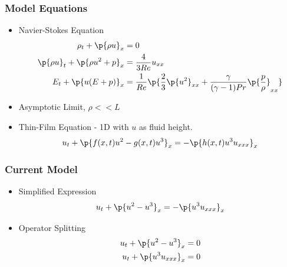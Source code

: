 \documentclass[10pt]{beamer}
\begin{document}
    \begin{frame}
      \frametitle{Model Equations}
      \begin{itemize}
        \item Navier-Stokes Equation
          \begin{align*}
            \rho_t + \p{\rho u}_x &= 0 \\
            \p{\rho u}_t + \p{\rho u^2 + p}_x &=  \frac{4}{3Re} u_{xx} \\
            E_t + \p{u (E + p)}_x &= \frac{1}{Re} \p{\frac{2}{3} \p{u^2}_{xx} + \frac{\gamma}{(\gamma - 1)Pr} \p{\frac{p}{\rho}}_{xx}}
          \end{align*}
        \item Asymptotic Limit, $\rho << L$
        \item Thin-Film Equation - 1D with $u$ as fluid height.
          \[
            u_t + \p{f(x, t) u^2 - g(x, t) u^3}_x = -\p{h(x, t) u^3 u_{xxx}}_x
          \]
      \end{itemize}
    \end{frame}

    \begin{frame}
      \frametitle{Current Model}
      \begin{itemize}
        \item Simplified Expression
          \[
            u_t + \p{u^2 - u^3}_x = -\p{u^3 u_{xxx}}_x
          \]

        \item Operator Splitting
          \begin{align*}
            u_t + \p{u^2 - u^3}_x &= 0 \\
            u_t + \p{u^3 u_{xxx}}_x &= 0
          \end{align*}
      \end{itemize}
    \end{frame}
\end{document}
